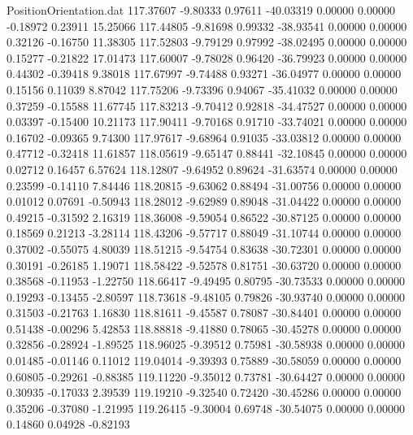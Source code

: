 \begin{filecontents}{PositionOrientation.dat}
 117.37607   -9.80333    0.97611   -40.03319    0.00000    0.00000   -0.18972    0.23911   15.25066
 117.44805   -9.81698    0.99332   -38.93541    0.00000    0.00000    0.32126   -0.16750   11.38305
 117.52803   -9.79129    0.97992   -38.02495    0.00000    0.00000    0.15277   -0.21822   17.01473
 117.60007   -9.78028    0.96420   -36.79923    0.00000    0.00000    0.44302   -0.39418    9.38018
 117.67997   -9.74488    0.93271   -36.04977    0.00000    0.00000    0.15156    0.11039    8.87042
 117.75206   -9.73396    0.94067   -35.41032    0.00000    0.00000    0.37259   -0.15588   11.67745
 117.83213   -9.70412    0.92818   -34.47527    0.00000    0.00000    0.03397   -0.15400   10.21173
 117.90411   -9.70168    0.91710   -33.74021    0.00000    0.00000    0.16702   -0.09365    9.74300
 117.97617   -9.68964    0.91035   -33.03812    0.00000    0.00000    0.47712   -0.32418   11.61857
 118.05619   -9.65147    0.88441   -32.10845    0.00000    0.00000    0.02712    0.16457    6.57624
 118.12807   -9.64952    0.89624   -31.63574    0.00000    0.00000    0.23599   -0.14110    7.84446
 118.20815   -9.63062    0.88494   -31.00756    0.00000    0.00000    0.01012    0.07691   -0.50943
 118.28012   -9.62989    0.89048   -31.04422    0.00000    0.00000    0.49215   -0.31592    2.16319
 118.36008   -9.59054    0.86522   -30.87125    0.00000    0.00000    0.18569    0.21213   -3.28114
 118.43206   -9.57717    0.88049   -31.10744    0.00000    0.00000    0.37002   -0.55075    4.80039
 118.51215   -9.54754    0.83638   -30.72301    0.00000    0.00000    0.30191   -0.26185    1.19071
 118.58422   -9.52578    0.81751   -30.63720    0.00000    0.00000    0.38568   -0.11953   -1.22750
 118.66417   -9.49495    0.80795   -30.73533    0.00000    0.00000    0.19293   -0.13455   -2.80597
 118.73618   -9.48105    0.79826   -30.93740    0.00000    0.00000    0.31503   -0.21763    1.16830
 118.81611   -9.45587    0.78087   -30.84401    0.00000    0.00000    0.51438   -0.00296    5.42853
 118.88818   -9.41880    0.78065   -30.45278    0.00000    0.00000    0.32856   -0.28924   -1.89525
 118.96025   -9.39512    0.75981   -30.58938    0.00000    0.00000    0.01485   -0.01146    0.11012
 119.04014   -9.39393    0.75889   -30.58059    0.00000    0.00000    0.60805   -0.29261   -0.88385
 119.11220   -9.35012    0.73781   -30.64427    0.00000    0.00000    0.30935   -0.17033    2.39539
 119.19210   -9.32540    0.72420   -30.45286    0.00000    0.00000    0.35206   -0.37080   -1.21995
 119.26415   -9.30004    0.69748   -30.54075    0.00000    0.00000    0.14860    0.04928   -0.82193

\end{filecontents}
